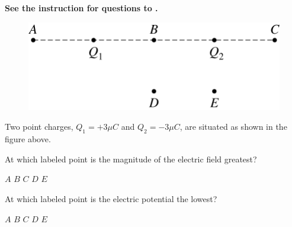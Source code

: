 \textbf{See the instruction for questions  to .}

\begin{figure}[H]
\centering
\includegraphics[scale=0.25]{images/img-011-033.png}
\end{figure}

Two point charges, $Q_{1}=+3 \unit{\mu C}$ and $Q_{2}=-3 \unit{\mu C}$, are situated as shown in the figure above.

\begin{questions}\setcounter{question}{20}\question
At which labeled point is the magnitude of the electric field greatest?

\begin{oneparchoices}
\choice $A$
\choice $B$
\choice $C$
\choice $D$
\choice $E$
\end{oneparchoices}\end{questions}

\begin{questions}\setcounter{question}{21}\question
At which labeled point is the electric potential the lowest?

\begin{oneparchoices}
\choice $A$
\choice $B$
\choice $C$
\choice $D$
\choice $E$
\end{oneparchoices}\end{questions}

